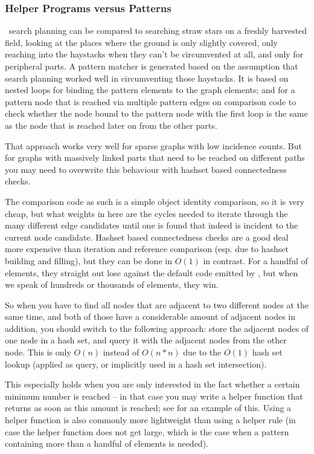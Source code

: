 \subsubsection*{Helper Programs versus Patterns}
\GrG\ search planning can be compared to searching straw stars on a freshly harvested field,
looking at the places where the ground is only slightly covered, 
only reaching into the haystacks when they can't be circumvented at all, and only for peripheral parts.
A pattern matcher is generated based on the assumption that search planning worked well in circumventing those haystacks. 
It is based on nested loops for binding the pattern elements to the graph elements;
and for a pattern node that is reached via multiple pattern edges
on comparison code to check
whether the node bound to the pattern node with the first loop
is the same as the node that is reached later on from the other parts. 


That approach works very well for sparse graphs with low incidence counts.
But for graphs with massively linked parts that need to be reached on different paths you may need to overwrite this behaviour with hashset based connectedness checks.

The comparison code as such is a simple object identity comparison, so it is very cheap, 
but what weights in here are the cycles needed to iterate through the many different edge candidates until one is found that indeed is incident to the current node candidate.
Hashset based connectedness checks are a good deal more expensive than iteration and reference comparison (esp. due to hashset building and filling), but they can be done in $O(1)$ in contrast.
For a handful of elements, they straight out lose against the default code emitted by \GrG, but when we speak of hundreds or thousands of elements, they win.

So when you have to find all nodes that are adjacent to two different nodes at the same time, 
and both of those have a considerable amount of adjacent nodes in addition,
you should switch to the following approach:
store the adjacent nodes of one node in a hash set, and query it with the adjacent nodes from the other node.
This is only $O(n)$ instead of $O(n*n)$ due to the $O(1)$ hash set lookup (applied as query, or implicitly used in a hash set intersection).

This especially holds when you are only interested in the fact whether a certain minimum number is reached -- in that case you may write a helper function that returns as soon as this amount is reached; see \cite{MovieDatabase} for an example of this.
Using a helper function is also commonly more lightweight than using a helper rule (in case the helper function does not get large, which is the case when a pattern containing more than a handful of elements is needed).

